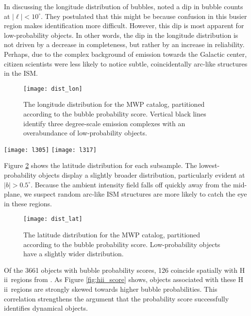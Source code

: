 \documentclass[preprint]{aastex}
\newcommand{\hii}[0]{{\sc H\,ii}}
\begin{document}
In discussing the longitude distribution of bubbles, \cite{Simpson12} noted a dip in bubble counts at $|\ell| < 10^\circ$. They postulated that this might be because confusion in this busier region makes identification more difficult. However, this dip is most apparent for low-probability objects. In other words, the dip in the longitude distribution is not driven by a decrease in completeness, but rather by an increase in reliability. Perhaps, due to the complex background of emission towards the Galactic center, citizen scientists were less likely to notice subtle, coincidentally arc-like structures in the ISM.

\begin{figure}[h!]
\texttt{[image: dist\_lon]}
\caption{The longitude distribution for the MWP catalog, partitioned according to the bubble probability score.
Vertical black lines identify three degree-scale emission complexes with an overabundance of low-probability objects.}
\label{fig:dist_lon}
\end{figure}


\begin{figure*}
\texttt{[image: l305]}
\texttt{[image: l317]}
\caption{Two fields with overabundances of low-probability bubbles in the MWP catalog.}
\label{fig:wide_fields}
\end{figure*}

Figure \ref{fig:dist_lat} shows the latitude distribution for each subsample. The lowest-probability objects display a slightly broader distribution, particularly evident at $|b| > 0.5^\circ$. Because the ambient intensity field falls off quickly away from the mid-plane, we suspect random arc-like ISM structures are more likely to catch the eye in these regions. 

\begin{figure}[h!]
\texttt{[image: dist\_lat]}
\caption{The latitude distribution for the MWP catalog, partitioned according to the bubble probability score.
Low-probability objects have a slightly wider distribution.}
\label{fig:dist_lat}
\end{figure}

Of the 3661 objects with bubble probability scores, 126 coincide spatially with \hii\, regions from \cite{Anderson11}. As Figure \ref{fig:hii_score} shows, objects associated with these \hii\, regions are strongly skewed towards higher bubble probabilities. This correlation strengthens the argument that the probability score successfully identifies dynamical objects.
\end{document}
